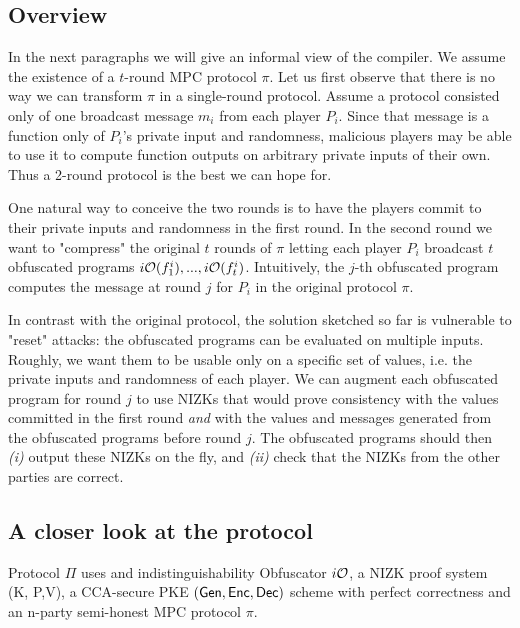 


\subsection{Overview}
In the next paragraphs we will give an informal view of the compiler.
We assume the existence of a $t$-round MPC protocol $\pi$. %
Let us first observe  that there is no way we can transform $\pi$ in a single-round protocol. Assume a protocol consisted only of one broadcast message $m_i$ from each player $P_i$. Since that message is a function only of $P_i$'s private input and randomness, malicious players may be able to use it to compute function outputs on arbitrary private inputs of their own. Thus a 2-round protocol is the best we can hope for.

One natural way to conceive the two rounds is to have the players commit to their private inputs and randomness in the first round.
In the second round we want to "compress" the original $t$ rounds of $\pi$ letting each player $P_i$ broadcast $t$ obfuscated programs
$i\mathcal{O}(f^i_1),...,i\mathcal{O}(f^i_t)$. Intuitively, the $j$-th obfuscated program computes the message at round $j$ for $P_i$ in the original protocol $\pi$.

In contrast with the original protocol, the solution sketched so far is vulnerable to "reset" attacks: the obfuscated programs can be evaluated on multiple inputs. Roughly, we want them to be usable only on a specific set of values, i.e. the private inputs and randomness of each player.
We can augment each obfuscated program for round $j$ to use NIZKs that would prove consistency with the values committed in the first round \emph{and} with the values and messages generated from the obfuscated programs before round $j$. The obfuscated programs should then \emph{(i)} output these NIZKs on the fly, and \emph{(ii)} check that the NIZKs from the other parties are correct.

\subsection{A closer look at the protocol}
Protocol $\Pi$ uses and indistinguishability Obfuscator $i\mathcal{O}$, a NIZK proof system (K, P,V), a CCA-secure PKE
$(\mathsf{Gen}, \mathsf{Enc}, \mathsf{Dec})$
scheme with perfect correctness and an n-party semi-honest MPC protocol $\pi$.

